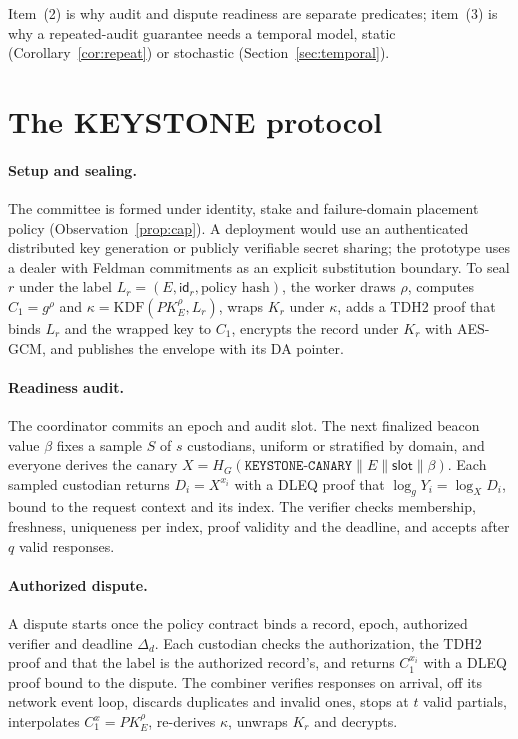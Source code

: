 \documentclass[Crown,sagev]{sagej}
\theoremstyle{plain}
\theoremstyle{definition}
\theoremstyle{remark}
\begin{document}
Item~(2) is why audit and dispute readiness are separate predicates; item~(3) is why a repeated-audit guarantee needs a temporal model, static (Corollary~\ref{cor:repeat}) or stochastic (Section~\ref{sec:temporal}).

\section{The KEYSTONE protocol}\label{sec:protocol}

\paragraph{Setup and sealing.} The committee is formed under identity, stake and failure-domain placement policy (Observation~\ref{prop:cap}). A deployment would use an authenticated distributed key generation or publicly verifiable secret sharing\cite{gennaro2007dkg,das2022adkg,schoenmakers1999pvss}; the prototype uses a dealer with Feldman commitments as an explicit substitution boundary. To seal $r$ under the label $L_r=(E,\mathsf{id}_r,\text{policy hash})$, the worker draws $\rho$, computes $C_1=g^{\rho}$ and $\kappa=\mathrm{KDF}(PK_E^{\rho},L_r)$, wraps $K_r$ under $\kappa$, adds a TDH2 proof that binds $L_r$ and the wrapped key to $C_1$\cite{shoup2002securing}, encrypts the record under $K_r$ with AES-GCM, and publishes the envelope with its DA pointer.

\paragraph{Readiness audit.} The coordinator commits an epoch and audit slot. The next finalized beacon value $\beta$ fixes a sample $S$ of $s$ custodians, uniform or stratified by domain, and everyone derives the canary $X=H_G(\texttt{KEYSTONE-CANARY}\parallel E\parallel \mathsf{slot}\parallel \beta)$. Each sampled custodian returns $D_i=X^{x_i}$ with a DLEQ proof that $\log_g Y_i=\log_X D_i$, bound to the request context and its index. The verifier checks membership, freshness, uniqueness per index, proof validity and the deadline, and accepts after $q$ valid responses.

\paragraph{Authorized dispute.} A dispute starts once the policy contract binds a record, epoch, authorized verifier and deadline $\Delta_d$. Each custodian checks the authorization, the TDH2 proof and that the label is the authorized record's, and returns $C_1^{x_i}$ with a DLEQ proof bound to the dispute. The combiner verifies responses on arrival, off its network event loop, discards duplicates and invalid ones, stops at $t$ valid partials, interpolates $C_1^{x}=PK_E^{\rho}$, re-derives $\kappa$, unwraps $K_r$ and decrypts.
\end{document}
